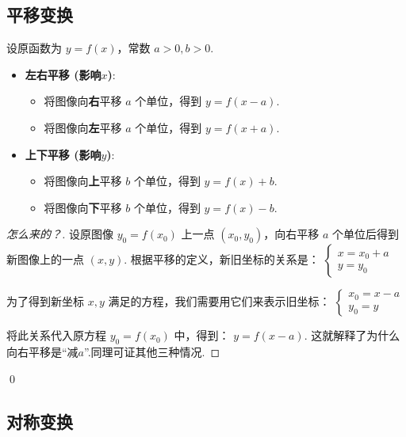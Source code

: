 \subsection{平移变换}

\begin{theorem}
	设原函数为 $y=f(x)$，常数 $a>0, b>0$.
	\begin{itemize}
		\item \textbf{左右平移 (影响$x$)}:
		\begin{itemize}
			\item 将图像向\textbf{右}平移 $a$ 个单位，得到 $y = f(x-a)$.
			\item 将图像向\textbf{左}平移 $a$ 个单位，得到 $y = f(x+a)$.
		\end{itemize}
		\item \textbf{上下平移 (影响$y$)}:
		\begin{itemize}
			\item 将图像向\textbf{上}平移 $b$ 个单位，得到 $y = f(x) + b$.
			\item 将图像向\textbf{下}平移 $b$ 个单位，得到 $y = f(x) - b$.
		\end{itemize}
	\end{itemize}
\end{theorem}
\begin{proof}[怎么来的？]
	设原图像 $y_0=f(x_0)$ 上一点 $(x_0, y_0)$，向右平移 $a$ 个单位后得到新图像上的一点 $(x,y)$.
	根据平移的定义，新旧坐标的关系是：
	$\begin{cases} x = x_0 + a \\ y = y_0 \end{cases}$
	
	为了得到新坐标 $x,y$ 满足的方程，我们需要用它们来表示旧坐标：
	$\begin{cases} x_0 = x-a \\ y_0 = y \end{cases}$
	
	将此关系代入原方程 $y_0=f(x_0)$ 中，得到：
	$y = f(x-a)$.
	这就解释了为什么向右平移是“减$a$”.同理可证其他三种情况.
\end{proof}
\qed

\subsection{对称变换}

